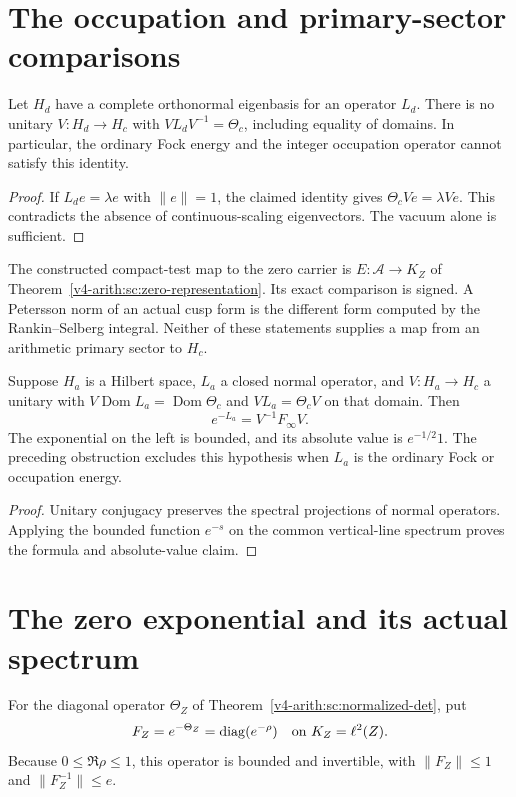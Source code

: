 \section{The occupation and primary-sector comparisons}
\begin{theorem}
\label{v4-arith:w9-r2:lem:L0-Mellin}
Let $H_d$ have a complete orthonormal eigenbasis for an operator
$L_d$. There is no unitary $V:H_d\to H_c$ with
$VL_dV^{-1}=\Theta_c$, including equality of domains.
In particular, the ordinary Fock energy and the integer occupation
operator cannot satisfy this identity.
\end{theorem}
\begin{proof}
If $L_d e=\lambda e$ with $\|e\|=1$, the claimed identity gives
$\Theta_c Ve=\lambda Ve$. This contradicts the absence of
continuous-scaling eigenvectors. The vacuum alone is sufficient.
\end{proof}

The constructed compact-test map to the zero carrier is
$E:\mathscr A\to K_Z$ of Theorem~\ref{v4-arith:sc:zero-representation}.
Its exact comparison is signed. A Petersson norm of an actual cusp
form is the different form computed by the Rankin--Selberg integral.
Neither of these statements supplies a map from an arithmetic
primary sector to $H_c$.

\begin{theorem}
\label{v4-arith:w9-r2:thm:conjugacy}
Suppose $H_a$ is a Hilbert space, $L_a$ a closed normal operator,
and $V:H_a\to H_c$ a unitary with
$V\operatorname{Dom}L_a=\operatorname{Dom}\Theta_c$ and
$VL_a=\Theta_c V$ on that domain.
Then
\[
 e^{-L_a}=V^{-1}F_\infty V.
\]
The exponential on the left is bounded, and its absolute value is
$e^{-1/2}1$. The preceding obstruction excludes this hypothesis when
$L_a$ is the ordinary Fock or occupation energy.
\end{theorem}
\begin{proof}
Unitary conjugacy preserves the spectral projections of normal
operators. Applying the bounded function $e^{-s}$ on the common
vertical-line spectrum proves the formula and absolute-value claim.
\end{proof}

\section{The zero exponential and its actual spectrum}
\begin{definition}
For the diagonal operator $\Theta_Z$ of
Theorem~\ref{v4-arith:sc:normalized-det}, put
\[
 F_Z=e^{-\Theta_Z}=\operatorname{diag}(e^{-\rho})
 \quad\hbox{on }K_Z=\ell^2(Z).
\]
Because $0\le\Re\rho\le1$, this operator is bounded and invertible,
with $\|F_Z\|\le1$ and $\|F_Z^{-1}\|\le e$.
\end{definition}

